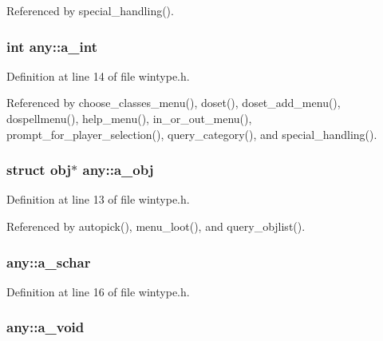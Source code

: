 Referenced by special\+\_\+handling().

\hypertarget{unionany_aae9fa40e12da390154868ea24a96c561}{
\subsubsection[{a\+\_\+int}]{\setlength{\rightskip}{0pt plus 5cm}int any\+::a\+\_\+int}}\label{unionany_aae9fa40e12da390154868ea24a96c561}


Definition at line 14 of file wintype.\+h.



Referenced by choose\+\_\+classes\+\_\+menu(), doset(), doset\+\_\+add\+\_\+menu(), dospellmenu(), help\+\_\+menu(), in\+\_\+or\+\_\+out\+\_\+menu(), prompt\+\_\+for\+\_\+player\+\_\+selection(), query\+\_\+category(), and special\+\_\+handling().

\hypertarget{unionany_a0b581808e661444ae19a63a5ccdbf367}{
\subsubsection[{a\+\_\+obj}]{\setlength{\rightskip}{0pt plus 5cm}struct {\bf obj}$\ast$ any\+::a\+\_\+obj}}\label{unionany_a0b581808e661444ae19a63a5ccdbf367}


Definition at line 13 of file wintype.\+h.



Referenced by autopick(), menu\+\_\+loot(), and query\+\_\+objlist().

\hypertarget{unionany_aba152669b54e0e5aa1a9c665be6abcb0}{
\subsubsection[{a\+\_\+schar}]{ any\+::a\+\_\+schar}}\label{unionany_aba152669b54e0e5aa1a9c665be6abcb0}


Definition at line 16 of file wintype.\+h.

\hypertarget{unionany_a570c320f6790aab4b51733abc54827d7}{
\subsubsection[{a\+\_\+void}]{ any\+::a\+\_\+void}}\label{unionany_a570c320f6790aab4b51733abc54827d7}


